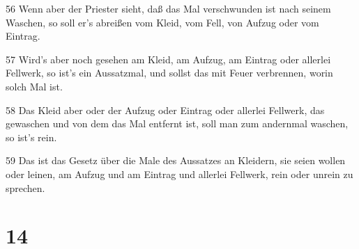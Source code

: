 \par 56 Wenn aber der Priester sieht, daß das Mal verschwunden ist nach seinem Waschen, so soll er's abreißen vom Kleid, vom Fell, von Aufzug oder vom Eintrag.
\par 57 Wird's aber noch gesehen am Kleid, am Aufzug, am Eintrag oder allerlei Fellwerk, so ist's ein Aussatzmal, und sollst das mit Feuer verbrennen, worin solch Mal ist.
\par 58 Das Kleid aber oder der Aufzug oder Eintrag oder allerlei Fellwerk, das gewaschen und von dem das Mal entfernt ist, soll man zum andernmal waschen, so ist's rein.
\par 59 Das ist das Gesetz über die Male des Aussatzes an Kleidern, sie seien wollen oder leinen, am Aufzug und am Eintrag und allerlei Fellwerk, rein oder unrein zu sprechen.

\chapter{14}

